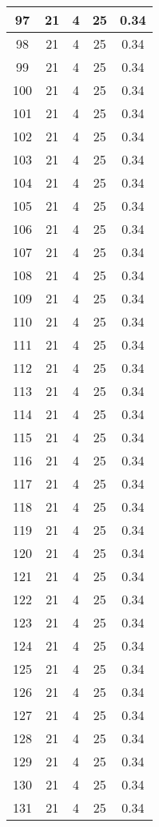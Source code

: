 \documentclass[letterpaper, 12pt]{article}
\begin{document}
\begin{longtable}{|c|c|c|c|c|}
\hline
97 & 21 & 4 & 25 & 0.34 \\
\hline
98 & 21 & 4 & 25 & 0.34 \\
\hline
99 & 21 & 4 & 25 & 0.34 \\
\hline
100 & 21 & 4 & 25 & 0.34 \\
\hline
101 & 21 & 4 & 25 & 0.34 \\
\hline
102 & 21 & 4 & 25 & 0.34 \\
\hline
103 & 21 & 4 & 25 & 0.34 \\
\hline
104 & 21 & 4 & 25 & 0.34 \\
\hline
105 & 21 & 4 & 25 & 0.34 \\
\hline
106 & 21 & 4 & 25 & 0.34 \\
\hline
107 & 21 & 4 & 25 & 0.34 \\
\hline
108 & 21 & 4 & 25 & 0.34 \\
\hline
109 & 21 & 4 & 25 & 0.34 \\
\hline
110 & 21 & 4 & 25 & 0.34 \\
\hline
111 & 21 & 4 & 25 & 0.34 \\
\hline
112 & 21 & 4 & 25 & 0.34 \\
\hline
113 & 21 & 4 & 25 & 0.34 \\
\hline
114 & 21 & 4 & 25 & 0.34 \\
\hline
115 & 21 & 4 & 25 & 0.34 \\
\hline
116 & 21 & 4 & 25 & 0.34 \\
\hline
117 & 21 & 4 & 25 & 0.34 \\
\hline
118 & 21 & 4 & 25 & 0.34 \\
\hline
119 & 21 & 4 & 25 & 0.34 \\
\hline
120 & 21 & 4 & 25 & 0.34 \\
\hline
121 & 21 & 4 & 25 & 0.34 \\
\hline
122 & 21 & 4 & 25 & 0.34 \\
\hline
123 & 21 & 4 & 25 & 0.34 \\
\hline
124 & 21 & 4 & 25 & 0.34 \\
\hline
125 & 21 & 4 & 25 & 0.34 \\
\hline
126 & 21 & 4 & 25 & 0.34 \\
\hline
127 & 21 & 4 & 25 & 0.34 \\
\hline
128 & 21 & 4 & 25 & 0.34 \\
\hline
129 & 21 & 4 & 25 & 0.34 \\
\hline
130 & 21 & 4 & 25 & 0.34 \\
\hline
131 & 21 & 4 & 25 & 0.34 \\

\end{longtable}
\end{document}

